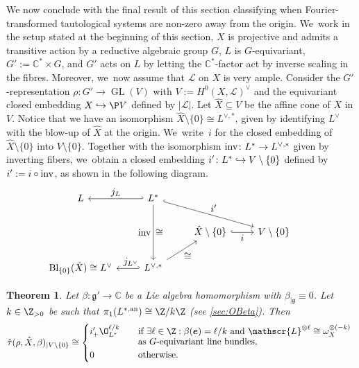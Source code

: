 \documentclass[JEP,XML,SOM,Unicode,published]{cedram}
\let\mathds\mathbb
\let\ts\textstyle
\newcommand\hto{\mathrel{\lhook\joinrel\to}}
\newcommand{\bme}{{\boldsymbol{e}}}
\newtheorem{thm}{Theorem}[section]
\newcommand{\dC}{{\mathds C}}\let\C\dC
\newcommand{\Ell}{\mathscr{L}}
\newcommand{\frg}{\mathfrak{g}}
\newcommand\restr[2]{{#1_{| {#2}}}}
\begin{document}
We now conclude with the final result of this section classifying when Fourier-transformed tautological systems are non-zero away from the origin. We~work in the setup stated at the beginning of this section, \ie $X$ is projective and admits a transitive action by a reductive algebraic group $G$, $L$ is $G$-equivariant,
$G':=\dC^*\times G$, and $G'$ acts on $L$ by letting the $\dC^*$-factor act by inverse scaling in the fibres.
Moreover, we~now assume that $\Ell$ on $X$ is very ample. Consider the $G'$-representation $\rho \colon G' \to \operatorname{GL}(V)$ with $V := H^0(X,\Ell)^\vee$ and the equivariant closed embedding $X \hto \P V$ defined by $|\Ell|$. Let $\hat X \subseteq V$ be the affine cone of $X$ in $V$. Notice that we have an isomorphism $\hat{X} \setminus \{0\} \cong L^{\vee,*}$, given by identifying $L^{\vee}$ with the blow-up of $\hat X$ at the origin. We~write~$i$ for the closed embedding of $\hat{X}\setminus \{0\}$ into $V\setminus \{0\}$. Together with the isomorphism $\textup{inv} \colon L^* \to L^{\vee,*}$ given by inverting fibers, we~obtain a closed embedding $i' \colon L^* \hto V \setminus \{0\}$ defined by $i':=i \circ \textup{inv}$, as shown in the following diagram.
\begin{equation}\label{diag:Maps}
\begin{tikzcd}
L & L^*\ar[swap,hook']{l}{\ts j_L} \ar[swap]{dd}{\ts \textup{inv}}[swap]{\ts \cong} \ar[hook]{rrd}{\ts i'} & & & \\
&&\hat{X} \setminus \{0\} \ar[hook]{r}[swap]{\ts i} & V \setminus \{0\} \\
\textup{Bl}_{\{0\}}(\hat{X})\cong L^\vee& L^{\vee,*}\ar[hook']{l}[swap]{\ts \;\;j_{L^\vee}} \ar[swap]{ur}{\ts \cong}
&&&
\end{tikzcd}
\end{equation}

\begin{thm} \label{thm:restrictedTauHatDescription}
Let
$\beta \colon \frg' \to \C$ be a Lie algebra homomorphism with $\restr{\beta}{\frg} \equiv 0$. Let $k \in \Z_{>0}$ be such that $\pi_1(L^{*,\mathrm{an}}) \cong \Z/k\Z$ (see \cref{sec:OBeta}). Then
\[
\restr{\hat{\tau}(\rho, \hat{X}, \beta)}{V \setminus \{0\}} \cong
\begin{cases}
i'_+ \O_{L^*}^{\ell/k} & \quad\text{if $\exists \ell \in \Z: \beta(\bme) = \ell/k$ and $\Ell^{\otimes \ell} \cong \omega_X^{\otimes (-k)}$ } \\[-3pt]
& \quad\text{as $G$-equivariant line bundles,} \\
0 & \quad\text{otherwise.}
\end{cases}
\]
\end{thm}
\end{document}
